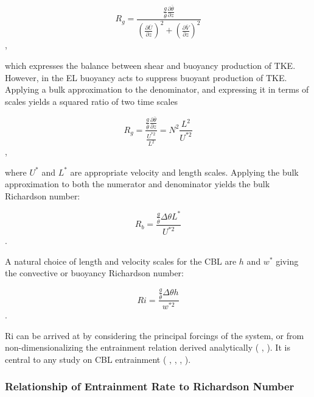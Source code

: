 \begin{equation}
R_{g} = \frac{ \frac{g}{\overline{\theta}} \frac{\partial \overline{\theta}}{\partial z}}{\left( \frac{ \partial \overline{U}}{\partial z} \right)^{2} + \left( \frac{\partial \overline{V}}{\partial z} \right)^{2}} 
\end{equation},

which expresses the balance between shear and buoyancy production of \acs{TKE}.  However, in the \acs{EL} buoyancy acts to suppress buoyant production of \acs{TKE}.  Applying a bulk approximation to the denominator, and expressing it in terms of scales yields a squared ratio of two time scales

\begin{equation}
R_{g} = \frac{\frac{g}{\overline{\theta}} \frac{\partial \overline{\theta}}{\partial z}}{\frac{U^{*2}}{L^{2}}} = N^{2}\frac{L^{2}}{U^{*2}}
\end{equation},


where $U^{*}$ and $L^{*}$ are appropriate velocity and length scales.  Applying the bulk approximation to both the numerator and denominator yields
the bulk Richardson number:

\begin{equation}
R_{b} = \frac{\frac{g}{\overline{\theta}} \Delta \theta L^{*}}{U^{*2}}
\end{equation}.

A natural choice of length and velocity scales for the \acs{CBL} are $h$ and $w^{*}$ giving the convective or buoyancy Richardson number:

\begin{equation}
Ri = \frac{\frac{g}{\overline{\theta}} \Delta \theta h}{w^{*2}}
\end{equation}.

\acs{Ri} can be arrived at by considering the principal forcings of the system, or from non-dimensionalizing the entrainment relation  derived analytically (\citeauthor{Tennekes73}  \citeyear{Tennekes73}, \citeauthor{Deardorff72} \citeyear{Deardorff72}). It is central to any study on \acs{CBL} entrainment (\citeauthor{SullMoengStev} \citeyear{SullMoengStev}, \citeauthor{FedConzMir04} \citeyear{FedConzMir04}, \citeauthor{Traum11} \citeyear{Traum11}, \citeauthor{BrooksFowler2} \citeyear{BrooksFowler2}).

\subsubsection{Relationship of Entrainment Rate to Richardson Number}

